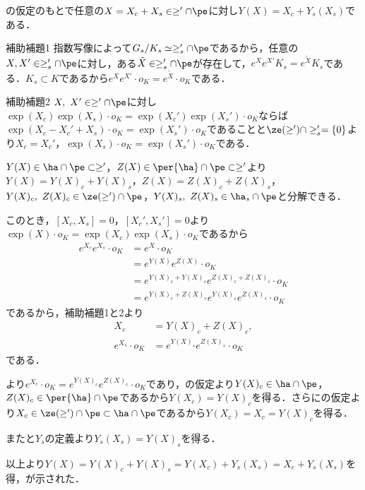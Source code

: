 \begin{lem}\label{lem:0117-decomp}
  の仮定のもとで任意の$X = X_c + X_s \in \ge'\cap\pe $に対し$Y(X) = X_c + Y_s(X_s) $である．
\end{lem}
\begin{npfwn}

  \leavevmode
  \begin{itembox}[l]{補助補題1}
    指数写像によって$G_s/K_s \simeq \ge_s'\cap \pe $であるから，任意の$X, X'\in \ge_{s}'\cap \pe $に対し，ある$\tilde{X}\in \ge_s'\cap \pe$が存在して，$e^{X}e^{X'}K_s = e^{\tilde{X}}K_s  $である．$K_s\subset K $であるから$e^{X}e^{X'}\cdot o_K = e^{\tilde{X}}\cdot o_K $である．
  \end{itembox}
  
  
  \begin{itembox}[l]{補助補題2}
    $X,\ X'\in \ge'\cap\pe $に対し$\exp(X_c)\exp(X_s)\cdot o_K = \exp(X_c')\exp(X_s')\cdot o_K $ならば$\exp(X_c-X_c'+X_s)\cdot o_K = \exp(X_s')\cdot o_K $であることと$\ze(\ge')\cap \ge_s' = \{0\} $より$X_c = X_c' $，$\exp(X_s)\cdot o_K = \exp(X_s')\cdot o_K$である．
  \end{itembox}
  
  $Y(X)\in \ha\cap\pe\subset \ge' $，$Z(X)\in \per{\ha}\cap\pe\subset \ge' $より$Y(X) = Y(X)_c + Y(X)_s $，$Z(X) = Z(X)_c + Z(X)_s $，$Y(X)_c,\ Z(X)_c \in \ze(\ge')\cap\pe  $，$Y(X)_s,\ Z(X)_s\in \ha_s\cap\pe $と分解できる．

  このとき，$[X_c, X_s] = 0 $，$[X_c', X_s'] = 0$より$\exp(X)\cdot o_K = \exp(X_c)\exp(X_s)\cdot o_K $であるから
  \begin{align*}
    e^{X_c}e^{X_s}\cdot o_K &= e^{X}\cdot o_K \\
                            &= e^{Y(X)}e^{Z(X)}\cdot o_K\\
                            &= e^{Y(X)_c + Y(X)_s}e^{Z(X)_c + Z(X)_s}\cdot o_K\\
                            &= e^{Y(X)_c + Z(X)_c}e^{Y(X)_s}e^{Z(X)_s}\cdot o_K
  \end{align*}
  であるから，補助補題1と2より
  \begin{align}
    X_c &= Y(X)_c + Z(X)_c ,\label{eq:zensha} \\
    e^{X_s}\cdot o_K &= e^{Y(X)_s}e^{Z(X)_s}\cdot o_K\label{eq:kousha}
  \end{align}
  である．

  より$e^{X_c} \cdot o_K = e^{Y(X)_c}e^{Z(X)_c}\cdot o_K $であり，の仮定より$Y(X)_c \in \ha\cap \pe$，$  Z(X)_c \in \per{\ha}\cap \pe$であるから$Y(X_c) = Y(X)_c $を得る．さらにの仮定より$X_c\in \ze(\ge')\cap \pe\subset \ha \cap \pe $であるから$Y(X_c) = X_c = Y(X)_c $を得る．

  またと$Y_s$の定義より$Y_s(X_s) = Y(X)_s $を得る．

  以上より$Y(X) = Y(X)_c + Y(X)_s = Y(X_c) + Y_s(X_s) = X_c + Y_s(X_s) $を得，が示された．
\end{npfwn}

